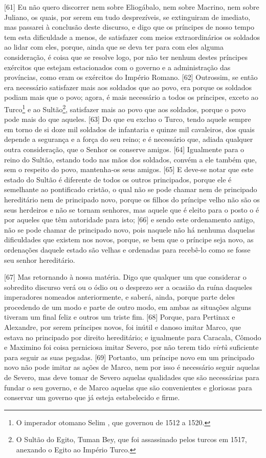 {[}61{]} Eu não quero discorrer nem sobre Eliogábalo, nem sobre Macrino,
nem sobre Juliano, os quais, por serem em tudo desprezíveis, se
extinguiram de imediato, mas passarei à conclusão deste discurso, e digo
que os príncipes de nosso tempo tem esta dificuldade a menos, de
satisfazer com meios extraordinários os soldados ao lidar com eles,
porque, ainda que se deva ter para com eles alguma consideração, é coisa
que se resolve logo, por não ter nenhum destes príncipes exércitos que
estejam estacionados com o governo e a administração das províncias,
como eram os exércitos do Império Romano. {[}62{]} Outrossim, se então
era necessário satisfazer mais aos soldados que ao povo, era porque os
soldados podiam mais que o povo; agora, é mais necessário a todos os
príncipes, exceto ao Turco\footnote{O imperador otomano Selim , que
  governou de 1512 a 1520.} e ao Sultão\footnote{O Sultão do Egito,
  Tuman Bey, que foi assassinado pelos turcos em 1517, anexando o Egito
  ao Império Turco.}, satisfazer mais ao povo que aos soldados, porque o
povo pode mais do que aqueles. {[}63{]} Do que eu excluo o Turco, tendo
aquele sempre em torno de si doze mil soldados de infantaria e quinze
mil cavaleiros, dos quais depende a segurança e a força do seu reino; e
é necessário que, adiada qualquer outra consideração, que o Senhor os
conserve amigos. {[}64{]} Igualmente para o reino do Sultão, estando
todo nas mãos dos soldados, convém a ele também que, sem o respeito do
povo, mantenha-os seus amigos. {[}65{]} E deve-se notar que este estado
do Sultão é diferente de todos os outros principados, porque ele é
semelhante ao pontificado cristão, o qual não se pode chamar nem de
principado hereditário nem de principado novo, porque os filhos do
príncipe velho não são os seus herdeiros e não se tornam senhores, mas
aquele que é eleito para o posto o é por aqueles que têm autoridade para
isto; {[}66{]} e sendo este ordenamento antigo, não se pode chamar de
principado novo, pois naquele não há nenhuma daquelas dificuldades que
existem nos novos, porque, se bem que o príncipe seja novo, as
ordenações daquele estado são velhas e ordenadas para recebê-lo como se
fosse seu senhor hereditário.

{[}67{]} Mas retornando à nossa matéria. Digo que qualquer um que
considerar o sobredito discurso verá ou o ódio ou o desprezo ser a
ocasião da ruína daqueles imperadores nomeados anteriormente, e saberá,
ainda, porque parte deles procedendo de um modo e parte de outro modo,
em ambas as situações alguns tiveram um final feliz e outros um triste
fim. {[}68{]} Porque, para Pertinax e Alexandre, por serem príncipes
novos, foi inútil e danoso imitar Marco, que estava no principado por
direito hereditário; e igualmente para Caracala, Cômodo e Maximino foi
coisa perniciosa imitar Severo, por não terem tido \emph{virtù}
suficiente para seguir as suas pegadas. {[}69{]} Portanto, um príncipe
novo em um principado novo não pode imitar as ações de Marco, nem por
isso é necessário seguir aquelas de Severo, mas deve tomar de Severo
aquelas qualidades que são necessárias para fundar o seu governo, e de
Marco aquelas que são convenientes e gloriosas para conservar um governo
que já esteja estabelecido e firme.

